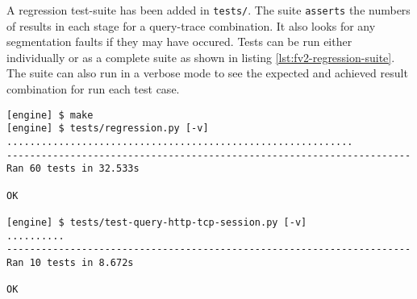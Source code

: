 A regression test-suite has been added in \texttt{tests/}. The suite
\texttt{asserts} the numbers of results in each stage for a query-trace
combination. It also looks for any segmentation faults if they may have
occured. Tests can be run either individually or as a complete
suite as shown in listing \ref{lst:fv2-regression-suite}. The suite can also
run in a verbose mode to see the expected and achieved result combination for
run each test case.

\begin{lstlisting}
[engine] $ make
[engine] $ tests/regression.py [-v]
............................................................
----------------------------------------------------------------------
Ran 60 tests in 32.533s

OK

[engine] $ tests/test-query-http-tcp-session.py [-v]
..........
----------------------------------------------------------------------
Ran 10 tests in 8.672s

OK
\end{lstlisting}

